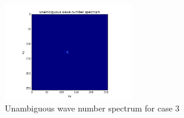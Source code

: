 \documentclass[12pt]{article}
\begin{document}
\begin{figure}
  \caption{Unambiguous wave number spectrum for case 3}
  \centering
    \includegraphics[width=0.5\textwidth]{unam_w_n_s_3.png}
\end{figure}
\end{document}
